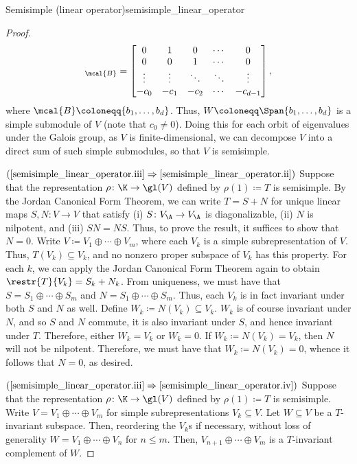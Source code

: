 \begin{thm}{Semisimple (linear operator)}{semisimple_linear_operator}
\begin{proof}
		\begin{equation}
		[T]_{\mcal{B}}=\begin{bmatrix}0 & 1 & 0 & \cdots & 0 \\ 0 & 0 & 1 & \cdots & 0 \\ \vdots & \vdots & \ddots & \ddots & \vdots \\ -c_0 & -c_1 & -c_2 & \cdots & -c_{d-1}\end{bmatrix},
		\end{equation}
		where $\mcal{B}\coloneqq \{ b_1,\ldots ,b_d\}$.  Thus, $W\coloneqq \Span \{ b_1,\ldots ,b_d\}$ is a simple submodule of $V$ (note that $c_0\neq 0$).  Doing this for each orbit of eigenvalues under the Galois group, as $V$ is finite-dimensional, we can decompose $V$ into a direct sum of such simple submodules, so that $V$ is semisimple.
		
		\blankline
		\noindent
		$(\cref{semisimple_linear_operator.iii}\Rightarrow \cref{semisimple_linear_operator.ii})$ Suppose that the representation $\rho \colon \K \rightarrow \gl (V)$ defined by $\rho (1)\coloneq T$ is semisimple.  By the Jordan Canonical Form Theorem, we can write $T=S+N$ for unique linear maps $S,N\colon V\rightarrow V$ that satisfy (i) $S\colon V_{\A}\rightarrow V_{\A}$ is diagonalizable, (ii) $N$ is nilpotent, and (iii) $SN=NS$.  Thus, to prove the result, it suffices to show that $N=0$.  Write $V\coloneqq V_1\oplus \cdots \oplus V_m$, where each $V_k$ is a simple subrepresentation of $V$.  Thus, $T(V_k)\subseteq V_k$, and no nonzero proper subspace of $V_k$ has this property.  For each $k$, we can apply the Jordan Canonical Form Theorem again to obtain $\restr{T}{V_k}=S_k+N_k$.  From uniqueness, we must have that $S=S_1\oplus \cdots \oplus S_m$ and $N=S_1\oplus \cdots \oplus S_m$.  Thus, each $V_k$ is in fact invariant under both $S$ and $N$ as well.  Define $W_k\coloneqq N(V_k)\subseteq V_k$.  $W_k$ is of course invariant under $N$, and so $S$ and $N$ commute, it is also invariant under $S$, and hence invariant under $T$.  Therefore, either $W_k=V_k$ or $W_k=0$.  If $W_k\coloneqq N(V_k)=V_k$, then $N$ will not be nilpotent.  Therefore, we must have that $W_k\coloneqq N(V_k)=0$, whence it follows that $N=0$, as desired.
		
		\blankline
		\noindent
		$(\cref{semisimple_linear_operator.iii}\Rightarrow \cref{semisimple_linear_operator.iv})$ Suppose that the representation $\rho \colon\K \rightarrow \gl (V)$ defined by $\rho (1)\coloneqq T$ is semisimple.  Write $V=V_1\oplus \cdots \oplus V_m$ for simple subrepresentations $V_k\subseteq V$.  Let $W\subseteq V$ be a $T$-invariant subspace.  Then, reordering the $V_k$s if necessary, without loss of generality $W=V_1\oplus \cdots \oplus V_n$ for $n\leq m$.  Then, $V_{n+1}\oplus \cdots \oplus V_m$ is a $T$-invariant complement of $W$.
		

\end{proof}
\end{thm}
